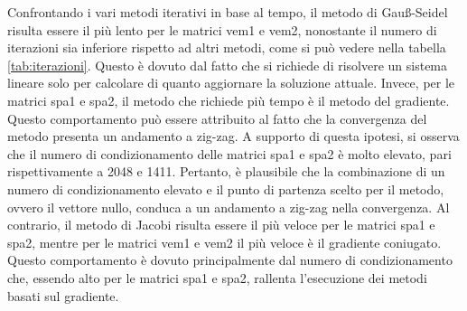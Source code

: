 Confrontando i vari metodi iterativi in base al tempo, il metodo di Gauß-Seidel
risulta essere il più lento per le matrici vem1 e vem2, nonostante il numero di
iterazioni sia inferiore rispetto ad altri metodi, come si può vedere nella tabella
\ref{tab:iterazioni}.
Questo è dovuto dal fatto che si richiede di risolvere un sistema lineare solo
per calcolare di quanto aggiornare la soluzione attuale.
Invece, per le matrici spa1 e spa2, il metodo che richiede più tempo è il metodo
del gradiente. Questo comportamento può essere attribuito al fatto che la convergenza
del metodo presenta un andamento a zig-zag. A supporto di questa ipotesi, si
osserva che il numero di condizionamento delle matrici spa1 e spa2 è molto elevato,
pari rispettivamente a 2048 e 1411. Pertanto, è plausibile che la combinazione
di un numero di condizionamento elevato e il punto di partenza scelto per il
metodo, ovvero il vettore nullo, conduca a un andamento a zig-zag nella convergenza.
Al contrario, il metodo di Jacobi risulta essere il più veloce per le matrici spa1
e spa2, mentre per le matrici vem1 e vem2 il più veloce è il gradiente coniugato.
Questo comportamento è dovuto principalmente dal numero di condizionamento che,
essendo alto per le matrici spa1 e spa2, rallenta l'esecuzione dei metodi basati
sul gradiente.

